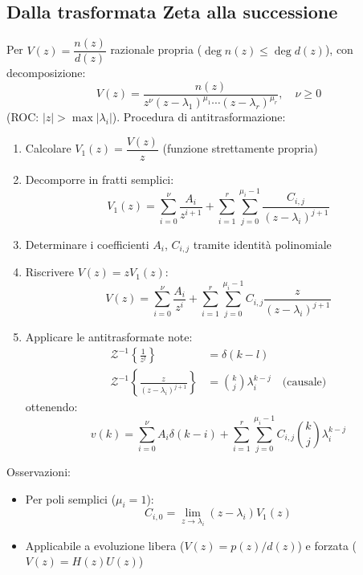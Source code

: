 \documentclass{article}
\theoremstyle{definition}
\begin{document}
\subsection{Dalla trasformata Zeta alla successione}
Per \(V(z) = \dfrac{n(z)}{d(z)}\) razionale propria (\(\deg n(z) \leq \deg d(z)\)), con decomposizione:
\[
V(z) = \frac{n(z)}{z^{\nu}(z - \lambda_1)^{\mu_1} \cdots (z - \lambda_r)^{\mu_r}}, \quad \nu \geq 0
\]
(ROC: \(|z| > \max |\lambda_i|\)). Procedura di antitrasformazione:
\begin{enumerate}
	\item Calcolare \(V_1(z) = \dfrac{V(z)}{z}\) (funzione strettamente propria)
	\item Decomporre in fratti semplici:
	\[
	V_1(z) = \sum_{i=0}^{\nu} \frac{A_i}{z^{i+1}} + \sum_{i=1}^{r} \sum_{j=0}^{\mu_i-1} \frac{C_{i,j}}{(z - \lambda_i)^{j+1}}
	\]
	\item Determinare i coefficienti \(A_i\), \(C_{i,j}\) tramite identità polinomiale
	\item Riscrivere \(V(z) = z V_1(z)\):
	\[
	V(z) = \sum_{i=0}^{\nu} \frac{A_i}{z^i} + \sum_{i=1}^{r} \sum_{j=0}^{\mu_i-1} C_{i,j} \frac{z}{(z - \lambda_i)^{j+1}}
	\]
	\item Applicare le antitrasformate note:
	\begin{align*}
		\mathcal{Z}^{-1}\left\{\frac{1}{z^l}\right\} &= \delta(k - l) \\
		\mathcal{Z}^{-1}\left\{\frac{z}{(z - \lambda_i)^{j+1}}\right\} &= \binom{k}{j} \lambda_i^{k-j} \quad \text{(causale)}
	\end{align*}
	ottenendo:
	\[
	v(k) = \sum_{i=0}^{\nu} A_i \delta(k - i) + \sum_{i=1}^{r} \sum_{j=0}^{\mu_i-1} C_{i,j} \binom{k}{j} \lambda_i^{k-j}
	\]
\end{enumerate}
Osservazioni:
\begin{itemize}
	\item Per poli semplici (\(\mu_i = 1\)):
	\[
	C_{i,0} = \lim_{z \to \lambda_i} (z - \lambda_i) V_1(z)
	\]
	\item Applicabile a evoluzione libera (\(V(z) = p(z)/d(z)\)) e forzata (\(V(z) = H(z)U(z)\))
\end{itemize}
 
\end{document}
